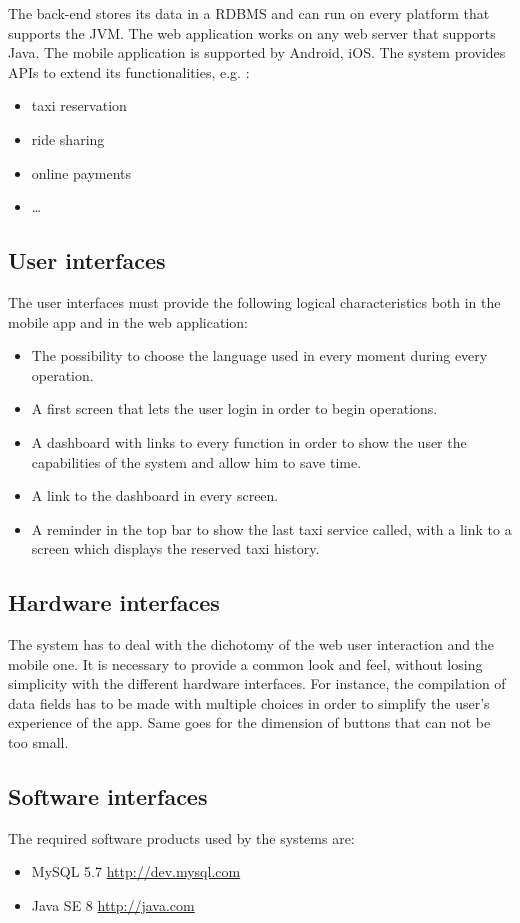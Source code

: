 The back-end stores its data in a RDBMS and  can run on every platform that supports the JVM.
The web application works on any web server that supports Java. The mobile application is supported by Android, iOS. The system provides APIs to extend its functionalities, e.g. :
\begin{itemize}
\item taxi reservation
\item ride sharing
\item online payments
\item \ldots
\end{itemize}


\subsection{User interfaces}
The user interfaces must provide the following logical characteristics both in the mobile app and in the web application:
\begin{itemize}
\item The possibility to choose the language used in every moment during every operation.
\item A first screen that lets the user login in order to begin operations.
\item A dashboard with links to every function in order to show the user the capabilities of the system and allow him to save time. 
\item A link to the dashboard in every screen.
\item A reminder in the top bar to show the last taxi service called, with a link to a screen which displays the reserved taxi history.
\end{itemize}

\subsection{Hardware interfaces} 
The system has to deal with the dichotomy of the web user interaction and the mobile one. It is necessary to provide a common look and feel, without losing simplicity with the different hardware interfaces. For instance, the compilation of data fields has to be made with multiple choices in order to simplify the user's experience of the app. Same goes for the dimension of buttons that can not be too small.

\subsection{Software interfaces}
The required software products used by the systems are:
\begin{itemize}
\item MySQL 5.7   \url{http://dev.mysql.com}
\item Java SE 8   \url{http://java.com}
\end{itemize}
